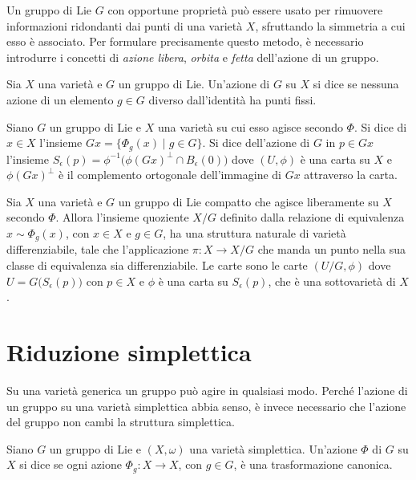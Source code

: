 Un gruppo di Lie $G$ con opportune proprietà può essere usato per rimuovere informazioni ridondanti dai punti di una varietà $X$, sfruttando la simmetria a cui esso è associato. Per formulare precisamente questo metodo, è necessario introdurre i concetti di \emph{azione libera}, \emph{orbita} e \emph{fetta} dell'azione di un gruppo.
\begin{definition}
  Sia $X$ una varietà e $G$ un gruppo di Lie. Un'azione di $G$ su $X$ si dice  se nessuna azione di un elemento $g \in G$ diverso dall'identità ha punti fissi.
\end{definition}
\begin{definition}
  Siano $G$ un gruppo di Lie e $X$ una varietà su cui esso agisce secondo $\Phi$. Si dice  di $x \in X$ l'insieme $Gx = \{ \Phi_g(x)\mid g \in G\}$. Si dice  dell'azione di $G$ in $p \in Gx$ l'insieme $S_{\epsilon}(p) = \phi^{-1}\big(\phi(Gx)^{\perp} \cap B_{\epsilon}(0)\big)$ dove $(U,\phi)$ è una carta su $X$ e $\phi(Gx)^{\perp}$ è il complemento ortogonale dell'immagine di $Gx$ attraverso la carta.
\end{definition}
\begin{theorem}
  Sia $X$ una varietà e $G$ un gruppo di Lie compatto che agisce liberamente su $X$ secondo $\Phi$. Allora l'insieme quoziente $X/G$ definito dalla relazione di equivalenza $x \sim \Phi_g(x)$, con $x \in X$ e $g \in G$, ha una struttura naturale di varietà differenziabile, tale che l'applicazione $\pi:X \to X /G$ che manda un punto nella sua classe di equivalenza sia differenziabile. Le carte sono le carte $(U/G,\phi)$ dove $U = G\big(S_{\epsilon}(p)\big)$ con $p \in X$ e $\phi$ è una carta su $S_{\epsilon}(p)$, che è una sottovarietà di $X$.
\end{theorem}

\section{Riduzione simplettica}
Su una varietà generica un gruppo può agire in qualsiasi modo. Perché l'azione di un gruppo su una varietà simplettica abbia senso, è invece necessario che l'azione del gruppo non cambi la struttura simplettica.
\begin{definition}
  Siano $G$ un gruppo di Lie e $(X, \omega)$ una varietà simplettica. Un'azione $\Phi$ di $G$ su $X$ si dice  se ogni azione $\Phi_g:X\to X$, con $g \in G$, è una trasformazione canonica.
\end{definition}

